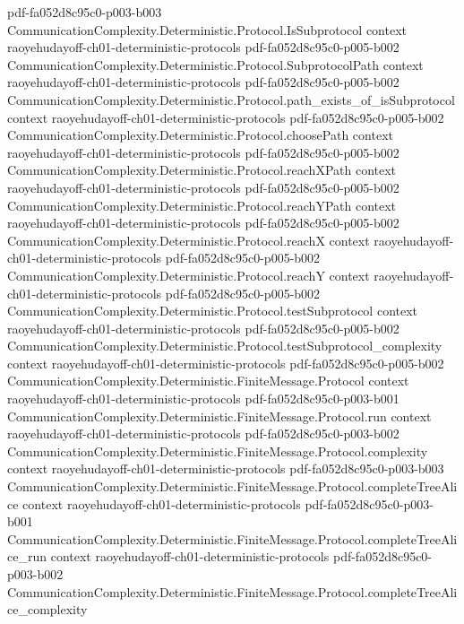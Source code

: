 \begin{theorem}
  {pdf-fa052d8c95c0-p003-b003}
\proofstep
  {CommunicationComplexity.Deterministic.Protocol.IsSubprotocol}
  {context}
  {raoyehudayoff-ch01-deterministic-protocols}
  {pdf-fa052d8c95c0-p005-b002}
\proofstep
  {CommunicationComplexity.Deterministic.Protocol.SubprotocolPath}
  {context}
  {raoyehudayoff-ch01-deterministic-protocols}
  {pdf-fa052d8c95c0-p005-b002}
\proofstep
  {CommunicationComplexity.Deterministic.Protocol.path_exists_of_isSubprotocol}
  {context}
  {raoyehudayoff-ch01-deterministic-protocols}
  {pdf-fa052d8c95c0-p005-b002}
\proofstep
  {CommunicationComplexity.Deterministic.Protocol.choosePath}
  {context}
  {raoyehudayoff-ch01-deterministic-protocols}
  {pdf-fa052d8c95c0-p005-b002}
\proofstep
  {CommunicationComplexity.Deterministic.Protocol.reachXPath}
  {context}
  {raoyehudayoff-ch01-deterministic-protocols}
  {pdf-fa052d8c95c0-p005-b002}
\proofstep
  {CommunicationComplexity.Deterministic.Protocol.reachYPath}
  {context}
  {raoyehudayoff-ch01-deterministic-protocols}
  {pdf-fa052d8c95c0-p005-b002}
\proofstep
  {CommunicationComplexity.Deterministic.Protocol.reachX}
  {context}
  {raoyehudayoff-ch01-deterministic-protocols}
  {pdf-fa052d8c95c0-p005-b002}
\proofstep
  {CommunicationComplexity.Deterministic.Protocol.reachY}
  {context}
  {raoyehudayoff-ch01-deterministic-protocols}
  {pdf-fa052d8c95c0-p005-b002}
\proofstep
  {CommunicationComplexity.Deterministic.Protocol.testSubprotocol}
  {context}
  {raoyehudayoff-ch01-deterministic-protocols}
  {pdf-fa052d8c95c0-p005-b002}
\proofstep
  {CommunicationComplexity.Deterministic.Protocol.testSubprotocol_complexity}
  {context}
  {raoyehudayoff-ch01-deterministic-protocols}
  {pdf-fa052d8c95c0-p005-b002}
\proofstep
  {CommunicationComplexity.Deterministic.FiniteMessage.Protocol}
  {context}
  {raoyehudayoff-ch01-deterministic-protocols}
  {pdf-fa052d8c95c0-p003-b001}
\proofstep
  {CommunicationComplexity.Deterministic.FiniteMessage.Protocol.run}
  {context}
  {raoyehudayoff-ch01-deterministic-protocols}
  {pdf-fa052d8c95c0-p003-b002}
\proofstep
  {CommunicationComplexity.Deterministic.FiniteMessage.Protocol.complexity}
  {context}
  {raoyehudayoff-ch01-deterministic-protocols}
  {pdf-fa052d8c95c0-p003-b003}
\proofstep
  {CommunicationComplexity.Deterministic.FiniteMessage.Protocol.completeTreeAlice}
  {context}
  {raoyehudayoff-ch01-deterministic-protocols}
  {pdf-fa052d8c95c0-p003-b001}
\proofstep
  {CommunicationComplexity.Deterministic.FiniteMessage.Protocol.completeTreeAlice_run}
  {context}
  {raoyehudayoff-ch01-deterministic-protocols}
  {pdf-fa052d8c95c0-p003-b002}
\proofstep
  {CommunicationComplexity.Deterministic.FiniteMessage.Protocol.completeTreeAlice_complexity}

\end{theorem}
